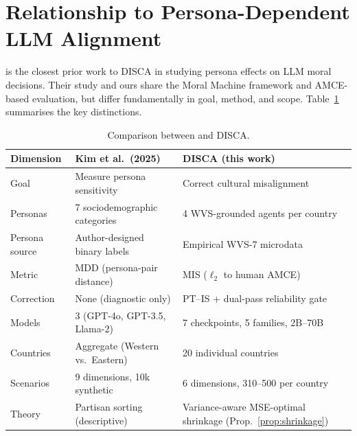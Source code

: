 \documentclass{article}
\begin{document}

\section{Relationship to Persona-Dependent LLM Alignment}
\label{app:kim_comparison}

\citet{kim2025persona} is the closest prior work to DISCA in studying persona effects on LLM moral decisions. Their study and ours share the Moral Machine framework and AMCE-based evaluation, but differ fundamentally in goal, method, and scope. Table~\ref{tab:kim_comparison} summarises the key distinctions.

\begin{table}[H]\centering\small
\caption{Comparison between \citet{kim2025persona} and DISCA.}
\label{tab:kim_comparison}
\setlength{\tabcolsep}{4pt}
\begin{tabular}{lll}\toprule
Dimension & Kim et al.\ (2025) & DISCA (this work) \\\midrule
Goal & Measure persona sensitivity & Correct cultural misalignment \\
Personas & 7 sociodemographic categories & 4 WVS-grounded agents per country \\
Persona source & Author-designed binary labels & Empirical WVS-7 microdata \\
Metric & MDD (persona-pair distance) & MIS ($\ell_2$ to human AMCE) \\
Correction & None (diagnostic only) & PT--IS + dual-pass reliability gate \\
Models & 3 (GPT-4o, GPT-3.5, Llama-2) & 7 checkpoints, 5 families, 2B--70B \\
Countries & Aggregate (Western vs.\ Eastern) & 20 individual countries \\
Scenarios & 9 dimensions, 10k synthetic & 6 dimensions, 310--500 per country \\
Theory & Partisan sorting (descriptive) & Variance-aware MSE-optimal shrinkage (Prop.~\ref{prop:shrinkage}) \\
\bottomrule
\end{tabular}
\end{table}
\end{document}
